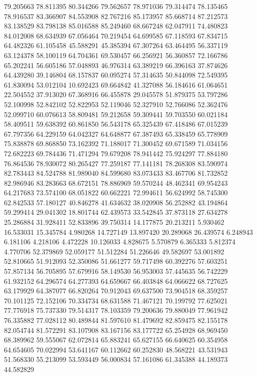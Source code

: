 79.205663
78.811395
80.344266
79.562657
78.971036
79.314474
78.135465
78.916537
83.366907
84.553908
82.767216
85.173957
85.668714
87.212573
83.138529
83.798138
85.016588
85.249460
68.667248
62.047911
74.480823
84.012008
68.634939
67.056464
70.219454
64.699585
67.118593
67.834715
64.482326
61.105458
45.588291
45.385394
67.307264
63.464495
56.337119
63.124378
58.100119
64.704361
69.530457
66.256921
56.360857
72.166786
65.202241
56.605186
57.048893
46.976314
63.389219
66.396163
37.874626
64.439280
39.146804
68.157837
60.095274
57.314635
50.844098
72.549395
61.830094
53.012104
10.692423
69.664842
41.327088
56.184616
61.064651
22.504552
37.913020
67.368916
66.455878
29.045578
51.879375
53.797286
52.100998
52.842102
52.822953
52.119046
52.327910
52.766086
52.362476
52.099710
60.076613
58.809481
59.212658
59.309441
59.703550
60.021184
58.409511
59.638392
60.861850
56.543178
65.325439
67.418486
67.015239
67.797356
64.229159
64.042327
64.648877
67.387493
65.338459
65.778909
75.838878
69.868850
73.162392
71.188017
71.300452
69.671589
71.034156
72.682223
69.784436
71.471294
79.679208
78.941442
75.924297
77.884180
76.864536
78.930072
80.265427
77.259187
77.141181
78.268308
83.590974
82.783443
84.524788
81.989040
84.599680
83.073433
83.467706
81.732852
82.986946
83.283663
68.672151
78.886969
59.570244
48.462341
69.954243
64.217683
73.574100
68.051822
60.662221
72.994611
56.624992
58.745300
62.842533
57.180127
40.846278
41.634632
38.020908
56.252882
43.194864
59.299414
29.041302
18.801744
62.439573
33.542845
37.873118
27.634278
25.286884
31.928411
52.833896
39.750314
14.177875
20.213211
5.930462
16.533031
15.345784
4.980268
14.727149
13.897420
20.289068
26.439574
6.248943
6.181106
4.218106
4.472228
10.126033
4.828675
5.570879
6.365333
5.812374
4.770706
52.379869
52.059177
51.512284
51.226646
49.582697
53.001892
52.810665
51.912093
52.350086
51.661277
59.717498
60.392276
57.603251
57.857134
56.705895
57.679916
58.149530
56.953003
57.445635
56.742229
61.932152
64.296574
64.277393
64.659667
66.403848
64.066622
68.727625
63.179929
64.387077
66.820264
70.912043
69.637500
73.904518
68.359257
70.101125
72.152106
70.334734
68.631588
71.467121
70.199792
77.625021
77.776918
75.737330
79.514317
78.103359
79.200636
79.880049
77.961942
76.335882
77.028112
80.489844
81.597610
81.479692
82.859475
82.155178
82.054744
81.572291
83.107908
83.167156
83.177722
65.254928
68.969450
68.389962
59.555067
62.072814
65.883241
65.627155
66.640625
60.354958
64.654605
70.022994
53.641167
60.112662
60.252830
48.568221
43.531943
51.568330
55.213099
53.593449
56.000834
57.161086
61.345388
44.189373
44.582829
